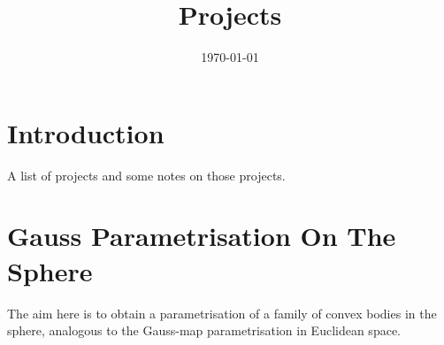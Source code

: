 \documentclass{amsart}
\begin{document}
\title{Projects}

\curraddr{}
\email{}
\date{\today}

\dedicatory{}
\subjclass[2010]{}
\keywords{}

\begin{abstract}
\end{abstract}

\maketitle

\section{Introduction}

A list of projects and some notes on those projects.

\section{Gauss Parametrisation On The Sphere}

The aim here is to obtain a parametrisation of a family of convex bodies in the sphere, analogous to the Gauss-map parametrisation in Euclidean space. 
\end{document}
